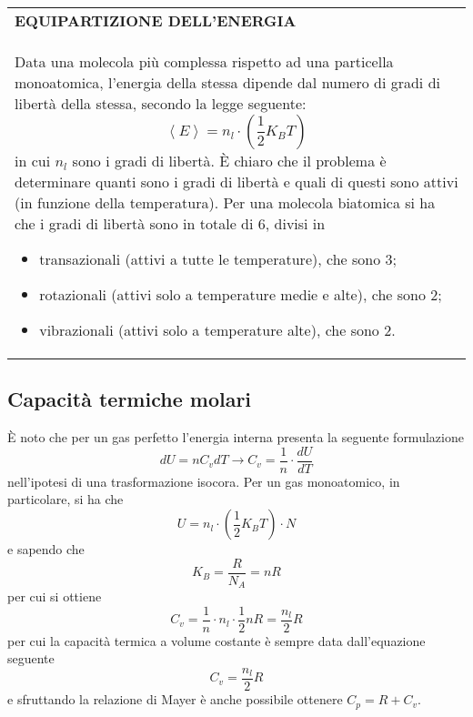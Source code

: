 \documentclass[a4paper]{extarticle}
\renewcommand\arraystretch{}
\begin{document}
\vspace{1em}
\setlength{\tabcolsep}{14pt}
\renewcommand{\arraystretch}{2}
\noindent
\begin{tabularx}{\textwidth}{@{}|P|@{}}
    \hline
    {\textbf{EQUIPARTIZIONE DELL'ENERGIA}}\\
    \parbox{\linewidth}{Data una molecola più complessa rispetto ad una particella monoatomica, l'energia della stessa dipende dal numero di gradi di libertà della stessa, secondo la legge seguente:
    \[\boxed{\left<E\right>=n_l \cdot \left(\frac{1}{2} K_B T\right)}\]
    in cui $n_l$ sono i gradi di libertà. È chiaro che il problema è determinare quanti sono i gradi di libertà e quali di questi sono attivi (in funzione della temperatura). Per una molecola biatomica si ha che i gradi di libertà sono in totale di $6$, divisi in
    \begin{itemize}
      \item transazionali (attivi a tutte le temperature), che sono $3$;
      \item rotazionali (attivi solo a temperature medie e alte), che sono $2$;
      \item vibrazionali (attivi solo a temperature alte), che sono $2$.
    \end{itemize}
    \vspace{1mm}}\\
    \hline
\end{tabularx}

\vspace{1em}
\subsection{Capacità termiche molari}
È noto che per un gas perfetto l'energia interna presenta la seguente formulazione
\[dU = n C_v dT \longrightarrow C_v = \frac{1}{n} \cdot \frac{dU}{dT}\]
nell'ipotesi di una trasformazione isocora. Per un gas monoatomico, in particolare, si ha che
\[U=n_l \cdot \left(\frac{1}{2} K_B T\right) \cdot N\]
e sapendo che
\[K_B = \frac{R}{N_A} = n R\]
per cui si ottiene
\[C_v = \frac{1}{n} \cdot n_l \cdot \frac{1}{2} n R = \frac{n_l}{2} R\]
per cui la capacità termica a volume costante è sempre data dall'equazione seguente
\[\boxed{C_v = \frac{n_l}{2} R}\]
e sfruttando la relazione di Mayer è anche possibile ottenere $C_p = R + C_v$.
\end{document}
